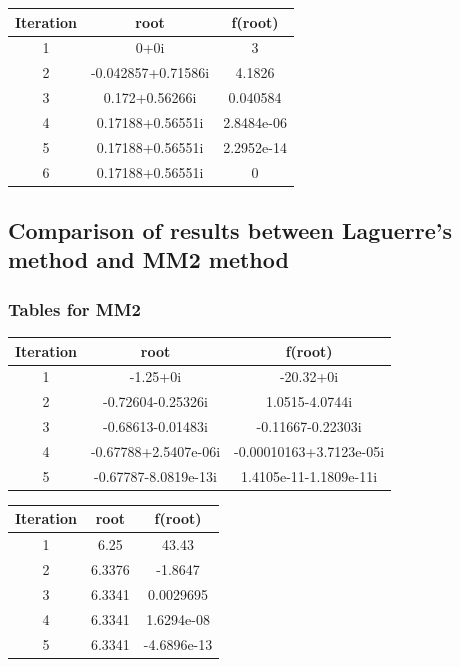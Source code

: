 \documentclass[12pt]{report}
\begin{document}
\begin{center}
  \begin{tabular}{| c  c c |}
\hline
Iteration & root         & f(root) \\
\hline
1   &           0+0i           &           3 \\
\hline
2   &   -0.042857+0.71586i     &      4.1826 \\
\hline
3   &       0.172+0.56266i     &    0.040584 \\
\hline
4   &    0.17188+0.56551i     &  2.8484e-06 \\
\hline
5   &     0.17188+0.56551i    &   2.2952e-14 \\
\hline
6   &     0.17188+0.56551i    &            0 \\
\hline


\end{tabular}
\end{center}


\subsection{Comparison of results between Laguerre's method and MM2 method}

\subsubsection{Tables for MM2}

\begin{center}
  \begin{tabular}{| c  c c |}
\hline
Iteration & root         & f(root) \\
\hline
1  &       -1.25+0i         &         -20.32+0i    \\
\hline
2  &    -0.72604-0.25326i   &         1.0515-4.0744i  \\
\hline
3  &   -0.68613-0.01483i    &      -0.11667-0.22303i   \\
\hline
4  &   -0.67788+2.5407e-06i &   -0.00010163+3.7123e-05i \\
\hline
5  &    -0.67787-8.0819e-13i &    1.4105e-11-1.1809e-11i \\
\hline
 \hline

\end{tabular}
\end{center}

\begin{center}
  \begin{tabular}{| c  c c |}
\hline
Iteration & root         & f(root) \\
\hline
1   &     6.25    &       43.43 \\
\hline
2   &   6.3376    &     -1.8647 \\
\hline
3   &  6.3341     &  0.0029695 \\
\hline
4   &   6.3341    &  1.6294e-08 \\
\hline
5   &   6.3341    & -4.6896e-13 \\
\hline
\hline

\end{tabular}
\end{center}
\end{document}
